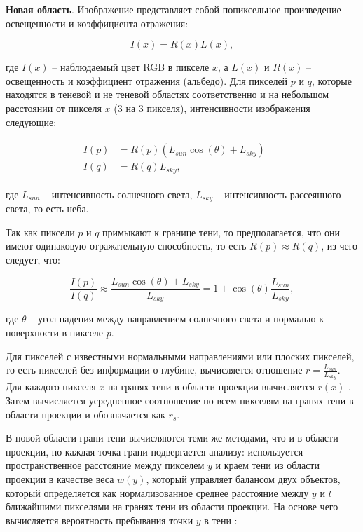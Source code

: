 \textbf{Новая область}. Изображение представляет собой попиксельное произведение освещенности и коэффициента отражения: 

\begin{equation}
	I(x) = R(x)L(x), 
\end{equation}

где $I(x)$ -- наблюдаемый цвет RGB в пикселе $x$, а $L(x)$ и $R(x)$ -- освещенность и коэффициент отражения (альбедо). Для пикселей $p$ и $q$, которые находятся в теневой и не теневой областях соответственно и на небольшом расстоянии от пикселя $x$ (3 на 3 пикселя), интенсивности изображения следующие:

\begin{equation}
	\begin{aligned}
		\begin{split}
			I(p) &= R(p)(L_{sun} \cos(\theta) + L_{sky}) &&\\
			I(q) &= R(q)L_{sky}, &&
		\end{split}
	\end{aligned}
\end{equation}

где $L_{sun}$ -- интенсивность солнечного света, $L_{sky}$ -- интенсивность рассеянного света, то есть неба.

Так как пиксели $p$ и $q$ примыкают к границе тени, то предполагается, что они имеют одинаковую отражательную способность, то есть $R(p) \approx R(q)$, из чего следует, что:

\begin{equation}
	\frac{I(p)}{I(q)} \approx \frac{L_{sun} \cos(\theta) + L_{sky}}{L_{sky}} = 1 + \cos(\theta)\frac{L_{sun}}{L_{sky}},
\end{equation}

где $\theta$ -- угол падения между направлением солнечного света и нормалью к поверхности в пикселе $p$.

Для пикселей с известными нормальными направлениями или плоских пикселей, то есть пикселей без информации о глубине, вычисляется отношение $r = \frac{L_{sun}}{L_{sky}}$. Для каждого пикселя $x$ на гранях тени в области проекции вычисляется $r(x)$ . Затем вычисляется усредненное соотношение по всем пикселям на гранях тени в области проекции и обозначается как $r_s$.

В новой области грани тени вычисляются теми же методами, что и в области проекции, но каждая точка грани подвергается анализу: используется пространственное расстояние между пикселем $y$ и краем тени из области проекции в качестве веса $w(y)$, который управляет балансом двух объектов, который определяется как нормализованное среднее расстояние между $y$ и $t$ ближайшими пикселями на гранях тени из области проекции. На основе чего вычисляется вероятность пребывания точки $y$ в тени \cite{wei2019simulating}:

